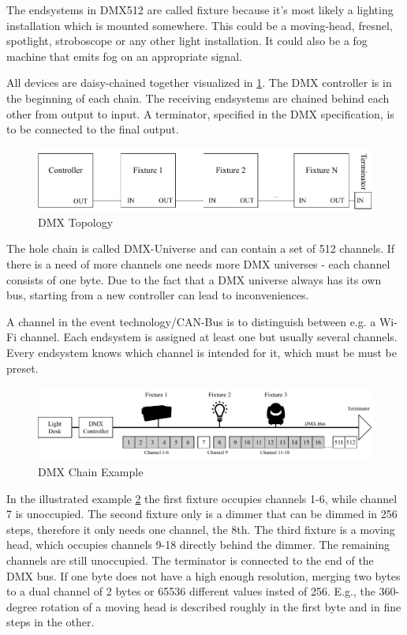 The endsystems in DMX512 are called fixture because it's most likely a lighting installation which is mounted somewhere.
This could be a moving-head, fresnel, spotlight, stroboscope or any other light installation.
It could also be a fog machine that emits fog on an appropriate signal.

All devices are daisy-chained together visualized in \ref{fig:dmx_diagram}.
The DMX controller is in the beginning of each chain.
The receiving endsystems are chained behind each other from output to input. 
A terminator, specified in the DMX specification, is to be connected to the final output.
 

\begin{figure}[h]
	\centering
	\includegraphics[scale=0.6]{figures/DMX_blockdiagram.pdf}
	\caption{DMX Topology}
	\label{fig:dmx_diagram}
\end{figure}

The hole chain is called DMX-Universe and can contain a set of 512 channels.
If there is a need of more channels one needs more DMX universes - each channel consists of one byte.
Due to the fact that a DMX universe always has its own bus, starting from a new controller can lead to inconveniences.

A channel in the event technology/CAN-Bus is to distinguish between e.g. a Wi-Fi channel.
Each endsystem is assigned at least one but usually several channels.
Every endsystem knows which channel is intended for it, which must be must be preset.

\begin{figure}[h]
	\centering
	\includegraphics[scale=0.6]{figures/DMX_Chain.pdf}
	\caption{DMX Chain Example}
	\label{fig:dmx_chain}
\end{figure}

In the illustrated example \cref{fig:dmx_chain} the first fixture occupies channels 1-6, while channel 7 is unoccupied.
The second fixture only is a dimmer that can be dimmed in 256 steps, therefore it only needs one channel, the 8th.
The third fixture is a moving head, which occupies channels 9-18 directly behind the dimmer.
The remaining channels are still unoccupied.
The terminator is connected to the end of the DMX bus.
If one byte does not have a high enough resolution, 
merging two bytes to a dual channel of 2 bytes or 65536 different values insted of 256.
E.g., the 360-degree rotation of a moving head is described roughly in the first byte and in fine steps in the other.

